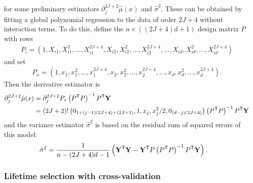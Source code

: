 %
for some preliminary estimators
$\partial^{2 J + 2}_j \hat\mu(x)$ and $\hat\sigma^2$.
These can be obtained by fitting a global polynomial regression
to the data of order $2 J + 4$ without interaction terms.
To do this, define the $n \times ((2 J + 4)d + 1)$ design matrix $P$ with rows
%
\begin{align*}
  P_i = \left(
    1, X_{i1}, X_{i1}^2, \ldots, X_{i1}^{2 J + 4},
    X_{i2}, X_{i2}^2, \ldots, X_{i2}^{2 J + 4},
    \ldots,
    X_{id}, X_{id}^2, \ldots, X_{id}^{2 J + 4}
  \right)
\end{align*}
%
and set
%
\begin{align*}
  P_x = \left(
    1, x_{1}, x_{1}^2, \ldots, x_{1}^{2 J + 4},
    x_{2}, x_{2}^2, \ldots, x_{2}^{2 J + 4},
    \ldots,
    x_{d}, x_{d}^2, \ldots, x_{d}^{2 J + 4}
  \right).
\end{align*}
%
Then the derivative estimator is
%
\begin{align*}
  \partial^{2 J + 2}_j \hat\mu(x)
  &=
  \partial^{2 J + 2}_j P_x
  \left( P^{\mathsf{T}} P \right)^{-1}
  P^{\mathsf{T}} \mathbf{Y} \\
  &=
  (2J + 2)!
  \left(
    0_{1 + (j-1)(2 J + 4) + (2J + 1)},
    1, x_j, x_j^2 / 2,
    0_{(d-j)(2 J + 4)}
  \right)
  \left( P^{\mathsf{T}} P \right)^{-1}
  P^{\mathsf{T}} \mathbf{Y}
\end{align*}
%
and the variance estimator $\hat\sigma^2$ is
based on the residual sum of squared errors of this model:
%
\begin{align*}
  \hat\sigma^2
  &=
  \frac{1}{n - (2J + 4)d - 1}
  \left(
    \mathbf{Y}^{\mathsf{T}} \mathbf{Y}
    - \mathbf{Y}^{\mathsf{T}} P \left( P^{\mathsf{T}} P \right)^{-1} P^{\mathsf{T}} \mathbf{Y}
  \right).
\end{align*}

\subsubsection*{Lifetime selection with cross-validation}

